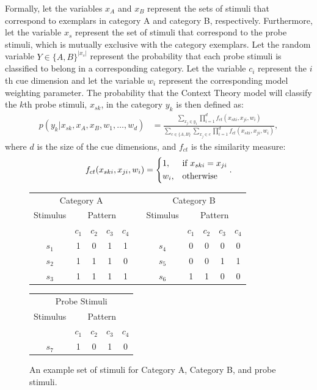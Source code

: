 \documentclass[11pt]{article}
\begin{document}
Formally, let the variables $x_A$ and $x_B$ represent the sets of stimuli that correspond to exemplars in category A and category B, respectively. Furthermore, let the variable $x_s$ represent the set of stimuli that correspond to the probe stimuli, which is mutually exclusive with the category exemplars. Let the random variable $Y \in \{A,B\}^{|x_s|}$ represent the probability that each probe stimuli is classified to belong in a corresponding category. Let the variable $c_i$ represent the $i$th cue dimension and let the variable $w_i$ represent the corresponding model weighting parameter. The probability that the Context Theory model will classify the $k$th probe stimuli, $x_{sk}$, in the category $y_k$ is then defined as:
\begin{align}
    p(y_k | x_{sk}, x_A, x_B, w_1, \dots, w_d) &= \frac{\sum\limits_{x_j \in y_1} \prod\limits_{i=1}^d f_{ct}(x_{ski}, x_{ji}, w_i)}{\sum\limits_{c \in \{A,B\}}\sum\limits_{x_j \in c} \prod\limits_{i=1}^d f_{ct}(x_{ski}, x_{ji}, w_i)}, \label{eq:ct_base}
\end{align}
where $d$ is the size of the cue dimensions, and $f_{ct}$ is the similarity measure:
\begin{align}
    f_{ct}(x_{ski}, x_{ji}, w_i) = 
        \begin{dcases}
            1  , & \text{if } x_{ski} = x_{ji}\\
            w_i, & \text{otherwise}
        \end{dcases}.
\end{align}

\begin{figure}[h]
\hspace{1cm}
\begin{tabular}{ccccccccccc}
\multicolumn{5}{c}{Category A} & \hspace{1cm} & \multicolumn{5}{c}{Category B} \\
Stimulus & \multicolumn{4}{c}{Pattern} & & Stimulus & \multicolumn{4}{c}{Pattern} \\
  & $c_1$ & $c_2$ & $c_3$ & $c_4$ & & & $c_1$ & $c_2$ & $c_3$ & $c_4$  \\ \cline{2-5} \cline{8-11}
$s_1$ & 1 & 0 & 1 & 1 & & $s_4$ & 0 & 0 & 0 & 0 \\
$s_2$ & 1 & 1 & 1 & 0 & & $s_5$ & 0 & 0 & 1 & 1 \\
$s_3$ & 1 & 1 & 1 & 1 & & $s_6$ & 1 & 1 & 0 & 0 
\end{tabular}
\vspace{1cm}
\newline
\begin{tabular}{ccccc}
\multicolumn{5}{c}{Probe Stimuli} \\
Stimulus & \multicolumn{4}{c}{Pattern} \\
  & $c_1$ & $c_2$ & $c_3$ & $c_4$ \\ \cline{2-5} 
$s_7$ & 1 & 0 & 1 & 0 
\end{tabular}
\centering
\caption{An example set of stimuli for Category A, Category B, and probe stimuli.}
\label{fig:cat_example}
\end{figure}
\end{document}
